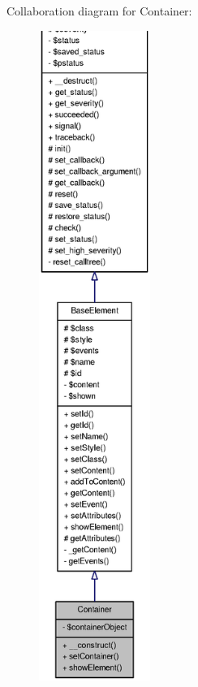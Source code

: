 Collaboration diagram for Container:\nopagebreak
\begin{figure}[H]
\begin{center}
\leavevmode
\includegraphics[height=600pt]{classContainer__coll__graph}
\end{center}
\end{figure}
